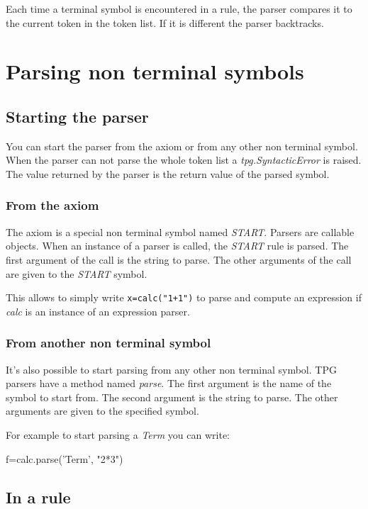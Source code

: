 Each time a terminal symbol is encountered in a rule, the parser compares it to the current token in the token list. If it is different the parser backtracks.

\section{Parsing non terminal symbols}                          \label{parser:nterm}

\subsection{Starting the parser}

You can start the parser from the axiom or from any other non terminal symbol.
When the parser can not parse the whole token list a \emph{tpg.SyntacticError} is raised.
The value returned by the parser is the return value of the parsed symbol.

\subsubsection{From the axiom}

The axiom is a special non terminal symbol named \emph{START}.
Parsers are callable objects.
When an instance of a parser is called, the \emph{START} rule is parsed.
The first argument of the call is the string to parse.
The other arguments of the call are given to the \emph{START} symbol.

This allows to simply write \verb!x=calc("1+1")! to parse and compute an expression if \emph{calc} is an instance of an expression parser.

\subsubsection{From another non terminal symbol}

It's also possible to start parsing from any other non terminal symbol.
TPG parsers have a method named \emph{parse}.
The first argument is the name of the symbol to start from.
The second argument is the string to parse.
The other arguments are given to the specified symbol.

For example to start parsing a \emph{Term}
you can write:
\begin{verbatimtab}[4]
    f=calc.parse('Term', "2*3")
\end{verbatimtab}

\subsection{In a rule}

